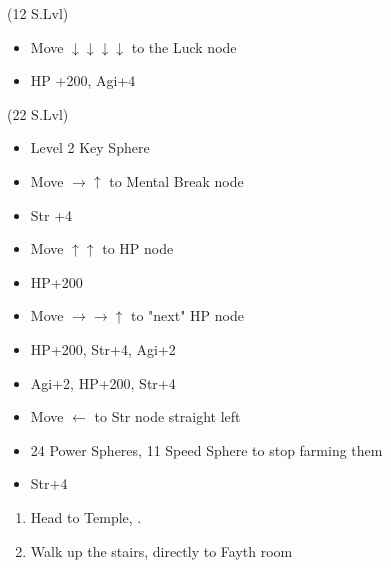 \begin{spheregrid}
    \begin{itemize}
        \kimahrif (12 S.Lvl)
        \begin{itemize}
            \item Move $\downarrow\downarrow\downarrow\downarrow$ to the Luck node
            \item HP +200, Agi+4
        \end{itemize}
        \tidusf (22 S.Lvl)
        \begin{itemize}
            \item Level 2 Key Sphere
            \item Move $\rightarrow\uparrow$ to Mental Break node
            \item Str +4
            \item Move $\uparrow\uparrow$ to HP node
            \item HP+200
            \item Move $\rightarrow\rightarrow\uparrow$ to "next" HP node
            \item HP+200, Str+4, Agi+2
            \item Agi+2, HP+200, Str+4
            \item Move $\leftarrow$ to Str node straight left
            \item 24 Power Spheres, 11 Speed Sphere to stop farming them
            \item Str+4
        \end{itemize}
    \end{itemize}
\end{spheregrid}
\begin{enumerate}[resume]
    \item Head to Temple, \save.
    \wincb
    \item Walk up the stairs, directly to Fayth room
\end{enumerate}
